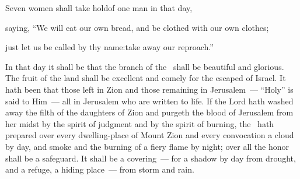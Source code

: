 
\begin{inparaenum}
  \pa{} Seven women shall take hold\pa{}of one man in that day,%

  \pa{}saying, ``We will eat our own bread, and be clothed with our own clothes;%

  \pa{}just let us be called by thy name:\pa{}take away our reproach.''%

  \noindent {} In that day it shall be that the branch of the \lord\ shall be beautiful and glorious. The fruit of the land shall be excellent and comely for the escaped of Israel.  It hath been that those left in Zion and those remaining in Jerusalem~--- ``Holy'' is said to Him~--- all in Jerusalem who are written to life.  If the Lord hath washed away the filth of the daughters of Zion and purgeth the blood of Jerusalem from her midst by the spirit of judgment and by the spirit of burning,  the \lord\ hath prepared over every dwelling-place of Mount Zion and every convocation a cloud by day, and smoke and the burning of a fiery flame by night; over all the honor shall be a safeguard.  It shall be a covering~--- for a shadow by day from drought, and a refuge, a hiding place~--- from storm and rain.%
\end{inparaenum}
